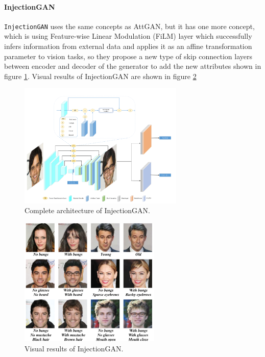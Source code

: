 \paragraph{InjectionGAN}
\texttt{InjectionGAN} \cite{9119402} uses the same concepts as AttGAN, but it has one more concept, which is using Feature-wise Linear Modulation (FiLM) layer which successfully infers information from external data and applies it as an affine transformation parameter to vision tasks, so they propose a new type of skip connection layers between encoder and decoder of the generator to add the new attributes shown in figure \ref{fig:injgan}. Visual results of InjectionGAN are shown in figure \ref{fig:injgan_res}

\begin{figure}[H]
    \centering
    \includegraphics[width=0.7\textwidth]{images/injectiongan.png}
    \caption{Complete architecture of InjectionGAN.}
    \label{fig:injgan}
\end{figure}

\begin{figure}[H]
    \centering
    \includegraphics[width=0.6\textwidth]{images/injectiongan-results.png}
    \caption{Visual results of InjectionGAN.}
    \label{fig:injgan_res}
\end{figure}


